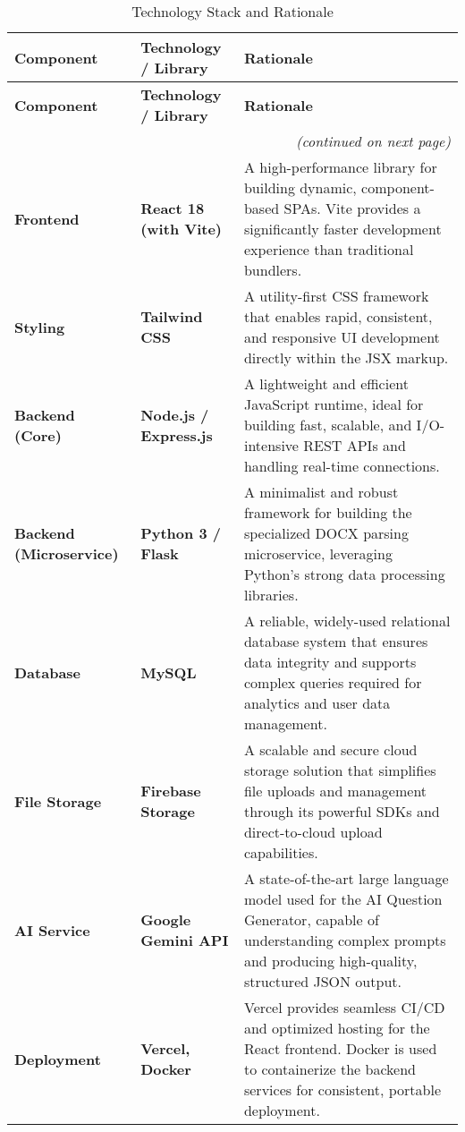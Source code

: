 \begin{longtable}{p{3cm} p{3cm} p{8cm}}
\caption{Technology Stack and Rationale} \label{tab:tech-stack} \\

\toprule
\textbf{Component} & \textbf{Technology / Library} & \textbf{Rationale} \\
\midrule
\endfirsthead

\toprule
\textbf{Component} & \textbf{Technology / Library} & \textbf{Rationale} \\
\midrule
\endhead

\midrule
\multicolumn{3}{r}{\textit{(continued on next page)}} \\[0.5em]
\midrule
\endfoot

\bottomrule
\endlastfoot

\textbf{Frontend} & \textbf{React 18 (with Vite)} &
A high-performance library for building dynamic, component-based SPAs.
Vite provides a significantly faster development experience than traditional bundlers. \\[0.5em]

\textbf{Styling} & \textbf{Tailwind CSS} &
A utility-first CSS framework that enables rapid, consistent, and responsive UI development directly within the JSX markup. \\[0.5em]

\textbf{Backend (Core)} & \textbf{Node.js / Express.js} &
A lightweight and efficient JavaScript runtime, ideal for building fast, scalable, and I/O-intensive REST APIs and handling real-time connections. \\[0.5em]

\textbf{Backend (Microservice)} & \textbf{Python 3 / Flask} &
A minimalist and robust framework for building the specialized DOCX parsing microservice, leveraging Python's strong data processing libraries. \\[0.5em]

\textbf{Database} & \textbf{MySQL} &
A reliable, widely-used relational database system that ensures data integrity and supports complex queries required for analytics and user data management. \\[0.5em]

\textbf{File Storage} & \textbf{Firebase Storage} &
A scalable and secure cloud storage solution that simplifies file uploads and management through its powerful SDKs and direct-to-cloud upload capabilities. \\[0.5em]

\textbf{AI Service} & \textbf{Google Gemini API} &
A state-of-the-art large language model used for the AI Question Generator, capable of understanding complex prompts and producing high-quality, structured JSON output. \\[0.5em]

\textbf{Deployment} & \textbf{Vercel, Docker} &
Vercel provides seamless CI/CD and optimized hosting for the React frontend.
Docker is used to containerize the backend services for consistent, portable deployment. \\[0.5em]

\end{longtable}


